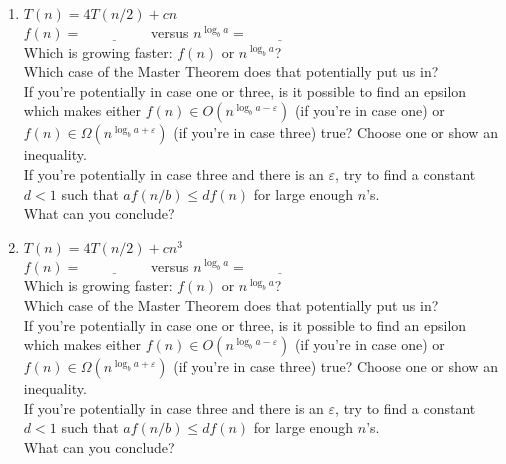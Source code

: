 \documentclass[12 pt]{amsart}
\renewcommand{\epsilon}{\varepsilon}
\begin{document}
\begin{enumerate}[label=\arabic*.)]
	\bigskip
	
	\item $T(n) = 4T(n/2) + cn$ \\
	$f(n) = \underline{\phantom{xxxxxxxx}}$ versus $n^{\log_b a} = \underline{\phantom{xxxxxxxx}}$ \\
	Which is growing faster: $f(n)$ or  $n^{\log_b a}$?  \underline{\phantom{xxxxxxxxxxx}} \\
	Which case of the Master Theorem does that potentially put us in?  \underline{\phantom{xxxx}} \\
	If you're potentially in case one or three, is it possible to find an epsilon which makes either $f(n) \in O(n^{\log_b a - \epsilon})$ (if you're in case one) or $f(n) \in \Omega(n^{\log_b a+ \epsilon})$ (if you're in case three) true? Choose one or show an inequality. \underline{\phantom{xxxxx}} \\
	If you're potentially in case three and there is an $\epsilon$, try to find a constant $d<1$ such that $a f(n/b) \leq d f(n)$ for large enough $n$'s.
	\underline{\phantom{xxxxxxxxxxxxxxx}}\\
	What can you conclude? \underline{\phantom{xxxxxxxxxxxxxxx}}
	
	\bigskip
	
	\item $T(n) = 4T(n/2) + cn^3$ \\
	$f(n) = \underline{\phantom{xxxxxxxx}}$ versus $n^{\log_b a} = \underline{\phantom{xxxxxxxx}}$ \\
	Which is growing faster: $f(n)$ or  $n^{\log_b a}$?  \underline{\phantom{xxxxxxxxxxx}} \\
	Which case of the Master Theorem does that potentially put us in?  \underline{\phantom{xxxx}} \\
	If you're potentially in case one or three, is it possible to find an epsilon which makes either $f(n) \in O(n^{\log_b a - \epsilon})$ (if you're in case one) or $f(n) \in \Omega(n^{\log_b a+ \epsilon})$ (if you're in case three) true? Choose one or show an inequality. \underline{\phantom{xxxxx}} \\
	If you're potentially in case three and there is an $\epsilon$, try to find a constant $d<1$ such that $a f(n/b) \leq d f(n)$ for large enough $n$'s.
	\underline{\phantom{xxxxxxxxxxxxxxx}}\\
	What can you conclude? \underline{\phantom{xxxxxxxxxxxxxxx}}
	
	\bigskip
	

\end{enumerate}
\end{document}
